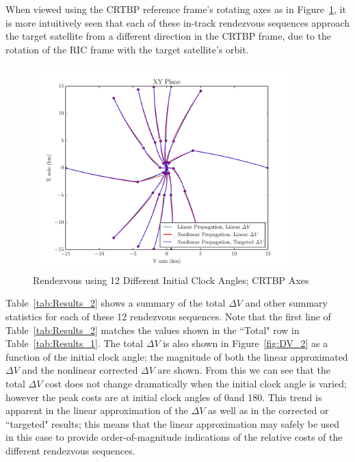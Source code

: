 \documentclass[letterpaper, preprint, paper,11pt]{AAS}	%
\begin{document}
\clearpage

When viewed using the CRTBP reference frame's rotating axes as in Figure~\ref{fig:RLP_2}, it is more intuitively seen that each of these in-track rendezvous sequences approach the target satellite from a different direction in the CRTBP frame, due to the rotation of the RIC frame with the target satellite's orbit.

\begin{figure}[h] 
	\begin{center}
		\includegraphics[width=0.9\textwidth]{RLP_2} %
		\caption{Rendezvous using 12 Different Initial Clock Angles; CRTBP Axes}
		\label{fig:RLP_2}
	\end{center}
\end{figure}

Table~\ref{tab:Results_2} shows a summary of the total \(\Delta V\) and other summary statistics for each of these 12 rendezvous sequences.  Note that the first line of Table~\ref{tab:Results_2} matches the values shown in the ``Total" row in Table~\ref{tab:Results_1}. The total \(\Delta V\) is also shown in Figure~\ref{fig:DV_2} as a function of the initial clock angle; the magnitude of both the linear approximated \(\Delta V\) and the nonlinear corrected \(\Delta V\) are shown.  From this we can see that the total \(\Delta V\) cost does not change dramatically when the initial clock angle is varied; however the peak costs are at initial clock angles of 0\textdegree and 180\textdegree.  This trend is apparent in the linear approximation of the \(\Delta V\) as well as in the corrected or ``targeted" results; this means that the linear approximation may safely be used in this case to provide order-of-magnitude indications of the relative costs of the different rendezvous sequences.  
\end{document}
